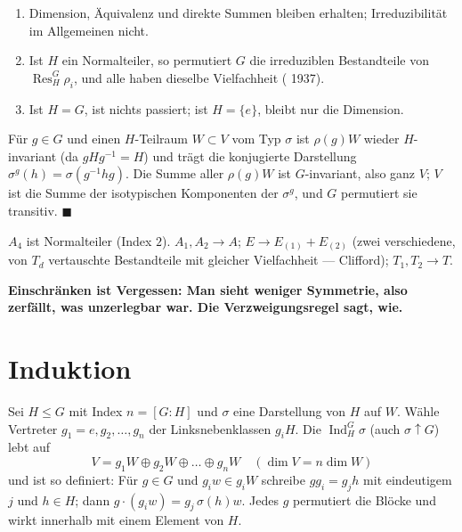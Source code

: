 \begin{merksatz}
\begin{enumerate}[label=(\alph*), leftmargin=1.6em]
\item Dimension, Äquivalenz und direkte Summen bleiben erhalten; Irreduzibilität im Allgemeinen nicht.
\item Ist $H$ ein Normalteiler, so permutiert $G$ die irreduziblen Bestandteile von $\operatorname{Res}^G_H\rho_i$, und alle haben dieselbe Vielfachheit ( 1937).
\item Ist $H = G$, ist nichts passiert; ist $H = \{e\}$, bleibt nur die Dimension.
\end{enumerate}

Für $g\in G$ und einen $H$-Teilraum $W\subset V$ vom Typ $\sigma$ ist $\rho(g)W$ wieder $H$-invariant (da $gHg^{-1} = H$) und trägt die konjugierte Darstellung $\sigma^{g}(h) = \sigma(g^{-1}hg)$. Die Summe aller $\rho(g)W$ ist $G$-invariant, also ganz $V$; $V$ ist die Summe der isotypischen Komponenten der $\sigma^{g}$, und $G$ permutiert sie transitiv. $\blacksquare$

$A_4$ ist Normalteiler (Index $2$). $A_1, A_2\to A$; $E\to E_{(1)} + E_{(2)}$ (zwei verschiedene, von $T_d$ vertauschte Bestandteile mit gleicher Vielfachheit --- Clifford); $T_1, T_2\to T$.

\begin{center}
\begin{minipage}{0.9\textwidth}
\textbf{Einschränken ist Vergessen: Man sieht weniger Symmetrie, also zerfällt, was unzerlegbar war. Die Verzweigungsregel sagt, wie.}
\end{minipage}
\end{center}
\end{merksatz}

\section{Induktion}

\begin{definition}
Sei $H\le G$ mit Index $n = [G\colon H]$ und $\sigma$ eine Darstellung von $H$ auf $W$. Wähle Vertreter $g_1 = e, g_2, \dots, g_n$ der Linksnebenklassen $g_iH$. Die  $\operatorname{Ind}^G_H\sigma$ (auch $\sigma\uparrow G$) lebt auf
\[ V = g_1W\oplus g_2W\oplus\dots\oplus g_nW\quad(\dim V = n\dim W) \]
und ist so definiert: Für $g\in G$ und $g_iw\in g_iW$ schreibe $gg_i = g_jh$ mit eindeutigem $j$ und $h\in H$; dann $g\cdot(g_iw) = g_j\,\sigma(h)w$. Jedes $g$ permutiert die Blöcke und wirkt innerhalb mit einem Element von $H$.
\end{definition}

